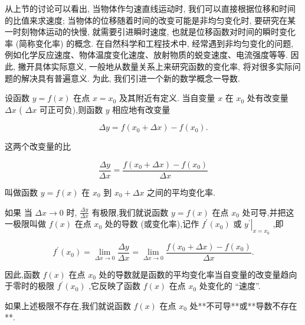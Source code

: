 \documentclass[lang=cn,newtx,10pt,scheme=chinese]{elegantbook}
\begin{document}
从上节的讨论可以看出, 当物体作匀速直线运动时, 我们可以直接根据位移和时间的比值来求速度; 当物体的位移随着时间的改变可能是非均匀变化时, 要研究在某一时刻物体运动的快慢, 就需要引进瞬时速度, 也就是位移函数对时间的瞬时变化率 (简称变化率) 的概念. 在自然科学和工程技术中, 经常遇到非均匀变化的问题, 例如化学反应速度、物体温度变化速度、放射物质的蜕变速度、电流强度等等. 因此, 撇开具体实际意义, 一般地从数量关系上来研究函数的变化率, 将对很多实际问题的解决具有普遍意义. 为此, 我们引进一个新的数学概念一导数.

\begin{definition}[平均变化率]
设函数 \(y = f\left( x\right)\) 在点 \(x = {x}_{0}\) 及其附近有定义. 当自变量 \(x\) 在 \({x}_{0}\) 处有改变量 \({\Delta x}\) ( \({\Delta x}\) 可正可负),则函数 \(y\) 相应地有改变量

\[
{\Delta y} = f\left( {{x}_{0} + {\Delta x}}\right) - f\left( {x}_{0}\right) .
\]

这两个改变量的比

\[
\frac{\Delta y}{\Delta x} = \frac{f\left( {{x}_{0} + {\Delta x}}\right) - f\left( {x}_{0}\right) }{\Delta x}
\]

叫做函数 \(y = f\left( x\right)\) 在 \({x}_{0}\) 到 \({x}_{0} + {\Delta x}\) 之间的平均变化率.

\end{definition}

\begin{definition}[导数]

如果 当 \({\Delta x} \rightarrow 0\) 时, \(\frac{\Delta y}{\Delta x}\) 有极限,我们就说函数 \(y = f\left( x\right)\) 在点 \({x}_{0}\) 处可导,并把这一极限叫做 \(f\left( x\right)\) 在点 \({x}_{0}\) 处的导数 (或变化率),记作 \({f}^{\prime }\left( {x}_{0}\right)\) 或 \({\left. {y}^{\prime }\right| }_{x = {x}_{0}}\) ,即

\[
{f}^{\prime }\left( {x}_{0}\right) = \mathop{\lim }\limits_{{{\Delta x} \rightarrow 0}}\frac{\Delta y}{\Delta x} = \mathop{\lim }\limits_{{{\Delta x} \rightarrow 0}}\frac{f\left( {{x}_{0} + {\Delta x}}\right) - f\left( {x}_{0}\right) }{\Delta x}. \tag{1}
\]

\end{definition}

因此,函数 \(f\left( x\right)\) 在点 \({x}_{0}\) 处的导数就是函数的平均变化率当自变量的改变量趋向于零时的极限 \({f}^{\prime }\left( {x}_{0}\right)\) ,它反映了函数 \(f\left( x\right)\) 在点 \({x}_{0}\) 处变化的 “速度”.

如果上述极限不存在,我们就说函数 \(f\left( x\right)\) 在点 \({x}_{0}\) 处**不可导**或**导数不存在**.
\end{document}
